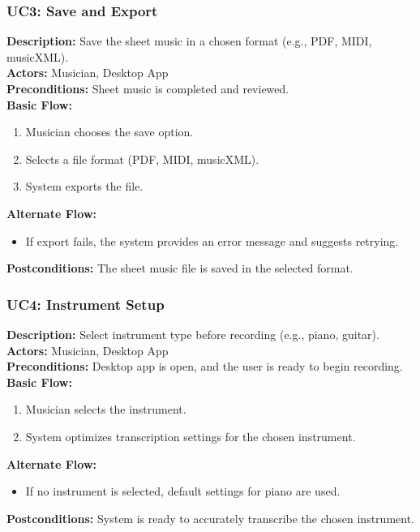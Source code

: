 \documentclass[12pt]{article}
\begin{document}
\subsubsection*{UC3: Save and Export}
\textbf{Description:} Save the sheet music in a chosen format (e.g., PDF, MIDI, musicXML). \\
\textbf{Actors:} Musician, Desktop App \\
\textbf{Preconditions:} Sheet music is completed and reviewed. \\
\textbf{Basic Flow:}
\begin{enumerate}
    \item Musician chooses the save option.
    \item Selects a file format (PDF, MIDI, musicXML).
    \item System exports the file.
\end{enumerate}
\textbf{Alternate Flow:}
\begin{itemize}
    \item If export fails, the system provides an error message and suggests retrying.
\end{itemize}
\textbf{Postconditions:} The sheet music file is saved in the selected format.

\subsubsection*{UC4: Instrument Setup}
\textbf{Description:} Select instrument type before recording (e.g., piano, guitar). \\
\textbf{Actors:} Musician, Desktop App \\
\textbf{Preconditions:} Desktop app is open, and the user is ready to begin recording. \\
\textbf{Basic Flow:}
\begin{enumerate}
    \item Musician selects the instrument.
    \item System optimizes transcription settings for the chosen instrument.
\end{enumerate}
\textbf{Alternate Flow:}
\begin{itemize}
    \item If no instrument is selected, default settings for piano are used.
\end{itemize}
\textbf{Postconditions:} System is ready to accurately transcribe the chosen instrument.
\end{document}

